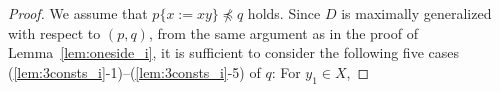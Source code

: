 \begin{proof}
We assume that $p \{ x := xy \} \not\preceq q$ holds. 
%
%
%
%
Since $D$ is maximally generalized {\color{red}with respect to} $(p,q)$, from the same argument as in the proof of Lemma~\ref{lem:oneside_i}, it is sufficient to consider the following five cases (\ref{lem:3consts_i}-1)--(\ref{lem:3consts_i}-5) of $q$: For $y_{1} \in X$,


\end{proof}
